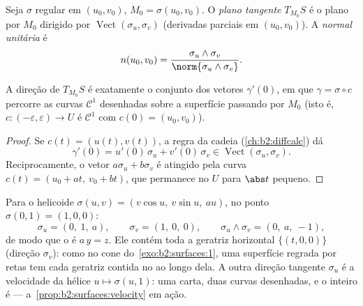 \begin{definition}\label{def:b2:surfaces:tangent}
Seja $\sigma$ regular em $(u_0, v_0)$, $M_0 = \sigma(u_0, v_0)$.
O \emph{plano tangente} $T_{M_0}S$ é o plano por $M_0$
dirigido por $\operatorname{Vect}(\sigma_u, \sigma_v)$ (derivadas parciais em
$(u_0, v_0)$). A \emph{normal unitária} é
\[
n(u_0, v_0)
= \frac{\sigma_u \wedge \sigma_v}
       {\norm{\sigma_u \wedge \sigma_v}} .
\]
\end{definition}

\begin{proposition}\label{prop:b2:surfaces:velocity}
A direção de $T_{M_0}S$ é exatamente o conjunto dos vetores
$\gamma'(0)$, em que $\gamma = \sigma \circ c$ percorre as
curvas $\mathcal{C}^1$ desenhadas sobre a superfície passando por $M_0$ (isto é,
$c \colon (-\varepsilon, \varepsilon) \to U$ é $\mathcal{C}^1$
com $c(0) = (u_0, v_0)$).
\end{proposition}

\begin{proof}
Se $c(t) = (u(t), v(t))$, a regra da cadeia
(\cref{ch:b2:diffcalc}) dá
\[
\gamma'(0) = u'(0)\,\sigma_u + v'(0)\,\sigma_v
\in \operatorname{Vect}(\sigma_u, \sigma_v).
\]
Reciprocamente, o vetor $a\sigma_u + b\sigma_v$ é atingido pela
curva $c(t) = (u_0 + at,\ v_0 + bt)$, que permanece no 
$U$ para $\abs t$ pequeno.
\end{proof}

\begin{example}
\label{ex:b2:surfaces:helicoidtangent}
Para o helicoide $\sigma(u, v) = (v\cos u,\ v\sin u,\ au)$,
no ponto $\sigma(0, 1) = (1, 0, 0)$:
\[
\sigma_u = (0,\ 1,\ a), \qquad \sigma_v = (1,\ 0,\ 0),
\qquad
\sigma_u \wedge \sigma_v = (0,\ a,\ -1),
\]
de modo que o  é $a\,y = z$. Ele contém toda a
geratriz horizontal $\{(t, 0, 0)\}$ (direção $\sigma_v$): como
no cone do~\cref{exo:b2:surfaces:1}, uma superfície regrada por
retas tem cada geratriz contida no  ao longo dela. A outra direção tangente $\sigma_u$ é a
velocidade da hélice $u \mapsto \sigma(u, 1)$: uma carta,
duas curvas desenhadas, e o  inteiro é  ---
a~\cref{prop:b2:surfaces:velocity} em ação.
\end{example}

